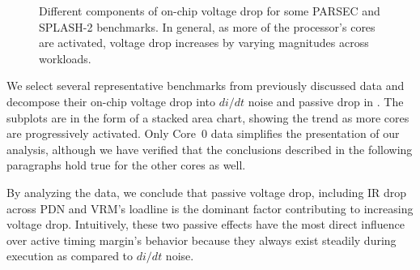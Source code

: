 \begin{figure}[t]
      \hfill
      \hfill
    \caption{Different components of on-chip voltage drop for some PARSEC and SPLASH-2 benchmarks. In general, as more of the processor's cores are activated, voltage drop increases by varying magnitudes across workloads.}
    \label{fig:drop-components} 
\end{figure}

We select several representative benchmarks from previously discussed data and decompose their on-chip voltage drop into $di/dt$ noise and passive drop in . The subplots are in the form of a stacked area chart, showing the trend as more cores are progressively activated. Only Core~0 data simplifies the presentation of our analysis, although we have verified that the conclusions described in the following paragraphs hold true for the other cores as well.

By analyzing the data, we conclude that passive voltage drop, including IR drop across PDN and VRM's loadline is the dominant factor contributing to increasing voltage drop. Intuitively, these two passive effects have the most direct influence over active timing margin's behavior because they always exist steadily during execution as compared to $di/dt$ noise.

